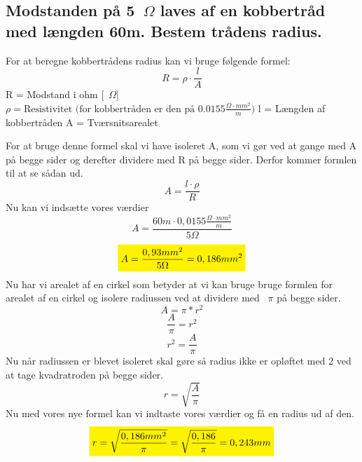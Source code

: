 \subsection{Modstanden på 5~$\Omega$ laves af en kobbertråd med længden 60m. Bestem trådens radius.}
For at beregne kobbertrådens radius kan vi bruge følgende formel:
\begin{equation*}
    R=\rho\cdot\frac{l}{A}
\end{equation*}
R = Modstand i ohm [~$\Omega$]\newline
\begin{math}
    \rho = \text{Resistivitet (for kobbertråden er den på } 0.0155 \frac{\Omega \cdot mm^{2}}{m})
\end{math}\newline
l = Længden af kobbertråden\newline
A = Tværsnitsarealet\newline

For at bruge denne formel skal vi have isoleret A, som vi gør ved at gange med A på begge sider og derefter dividere med R på begge sider. Derfor kommer formlen til at se sådan ud.
\begin{equation*}
    A=\frac{l\cdot\rho}{R}
\end{equation*}
Nu kan vi indsætte vores værdier
\begin{equation*}
    A=\frac{60m\cdot0,0155\frac{\Omega\cdot mm^{2}}{m}}{5\Omega}
\end{equation*}
\begin{equation*}
    \mathcolorbox{yellow}{A=\frac{0,93mm^{2}}{5\Omega}=0,186mm^{2}}
\end{equation*}
Nu har vi arealet af en cirkel som betyder at vi kan bruge bruge formlen for arealet af en cirkel og isolere radiussen ved at dividere med ~$\pi$ på begge sider.
\begin{equation*}
    A=\pi*r^{2}
\end{equation*}
\begin{equation*}
    \frac{A}{\pi}=r^{2}
\end{equation*}
\begin{equation*}
    r^{2}=\frac{A}{\pi}
\end{equation*}
Nu når radiussen er blevet isoleret skal gøre så radius ikke er opløftet med 2 ved at tage kvadratroden på begge sider.
\begin{equation*}
    r=\sqrt{\frac{A}{\pi}}
\end{equation*}
Nu med vores nye formel kan vi indtaste vores værdier og få en radius ud af den.
\begin{equation*}
    \mathcolorbox{yellow}{r=\sqrt{\frac{0,186mm^{2}}{\pi}} = \sqrt{\frac{0,186}{\pi}} = 0,243mm}
\end{equation*}

